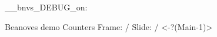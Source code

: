 \documentclass{beamer}
\begin{document}
\ExplSyntaxOn
\__bnvs_DEBUG_on:
\ExplSyntaxOff
\begin{frame}
{Beanoves demo}
{\large Counters}
Frame: \insertframenumber /
Slide: \insertslidenumber /
\only<-?(Main-1)>{}
\end{frame}
\end{document}
